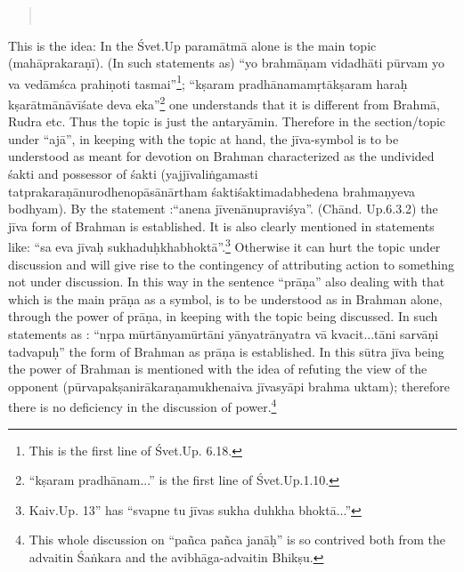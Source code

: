
\begin{verse}
\\
\end{verse}


This is the idea: In the Śvet.Up paramātmā alone is the main topic (mahāprakaraṇī). (In such statements as) “yo brahmāṇam vidadhāti pūrvam yo va vedāmśca prahiṇoti  tasmai”\footnote{This is the first line of Śvet.Up. 6.18.}; “kṣaram pradhānamamṛ\-tākṣaram haraḥ kṣarātmānāvīśate deva eka”\footnote{“kṣaram pradhānam...” is the first line of  Śvet.Up.1.10.} one understands that it is different from Brahmā, Rudra etc. Thus the topic is just the antaryāmin. Therefore in the section/topic under “ajā”, in keeping with the topic at hand, the jīva-symbol is to be understood as meant for devotion on Brahman characterized as the undivided śakti and possessor of śakti (yajjīvaliṅgamasti tatprakaraṇānurodhenopāsānārtham śaktiśaktimadabhedena brahmaṇyeva bodhyam). By the statement :\break “anena jīvenānupraviśya”. (Chānd. Up.6.3.2) the jīva form of Brahman is established. It is also clearly mentioned in statements like: “sa eva jīvaḥ sukhaduḥkhabhoktā”.\footnote{Kaiv.Up. 13” has “svapne tu jīvas sukha duhkha bhoktā...”} Otherwise it can hurt the topic under discussion and will give rise to the contingency of attributing action to something not under discussion.  In this way in the sentence “prāṇa” also dealing with that which is the main prāṇa as a symbol, is to be understood as in Brahman alone, through the power of prāṇa, in keeping with the topic being discussed. In such statements as : “nṛpa mūrtānyamūrtāni yānyatrānyatra vā kvacit...tāni sarvāṇi tadvapuḥ” the form of Brahman as prāṇa is established. In this sūtra jīva being the power of Brahman is mentioned with the idea of refuting the view of the opponent (pūrvapakṣanirākaraṇamukhenaiva jīvasyāpi brahma uktam); therefore there is no deficiency in the discussion of power.\footnote{This whole discussion on “pañca pañca janāḥ” is so contrived both from the advaitin Śaṅkara  and the avibhāga-advaitin Bhikṣu.}

